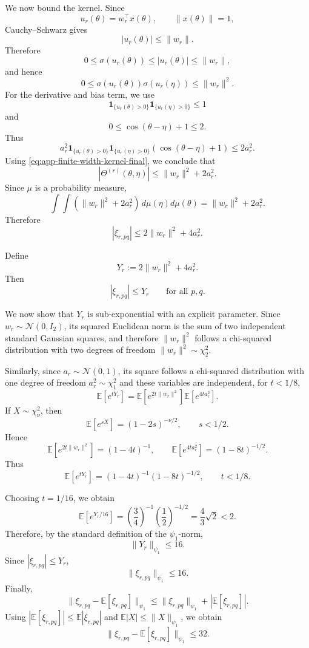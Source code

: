 We now bound the kernel. Since
\[
	u_r(\theta)=w_r^\top x(\theta),
	\qquad
	\|x(\theta)\|=1,
\]
Cauchy--Schwarz gives
\[
	|u_r(\theta)|\le \|w_r\|.
\]
Therefore
\[
	0\le \sigma(u_r(\theta))\le |u_r(\theta)|\le \|w_r\|,
\]
and hence
\[
	0\le \sigma(u_r(\theta))\sigma(u_r(\eta))\le \|w_r\|^2.
\]
For the derivative and bias term, we use
\[
	\mathbf 1_{\{u_r(\theta)>0\}}\mathbf 1_{\{u_r(\eta)>0\}}\le 1
\]
and
\[
	0\le \cos(\theta-\eta)+1\le 2.
\]
Thus
\[
	a_r^2
	\mathbf 1_{\{u_r(\theta)>0\}}
	\mathbf 1_{\{u_r(\eta)>0\}}
	(\cos(\theta-\eta)+1)
	\le
	2a_r^2.
\]
Using \eqref{eq:app-finite-width-kernel-final}, we conclude that
\[
	|\Theta^{(r)}(\theta,\eta)|
	\le
	\|w_r\|^2+2a_r^2.
\]
Since \(\mu\) is a probability measure,
\[
	\int\!\!\int
	(\|w_r\|^2+2a_r^2)\,d\mu(\eta)d\mu(\theta)
	=
	\|w_r\|^2+2a_r^2.
\]
Therefore
\begin{equation}
	|\xi_{r,pq}|
	\le
	2\|w_r\|^2+4a_r^2.
	\label{eq:app-finite-width-xi-bound}
\end{equation}

Define
\[
	Y_r:=2\|w_r\|^2+4a_r^2.
\]
Then
\[
	|\xi_{r,pq}|\le Y_r
	\qquad\text{for all }p,q.
\]

We now show that \(Y_r\) is sub-exponential with an explicit parameter. Since
\(w_r\sim \mathcal N(0,I_2)\), its squared Euclidean norm is the sum of two independent
standard Gaussian squares, and therefore \(\|w_r\|^2\) follows a chi-squared distribution
with two degrees of freedom \(\|w_r\|^2\sim \chi^2_2\).

Similarly, since \(a_r\sim \mathcal N(0,1)\), its square follows a chi-squared distribution
with one degree of freedom \(a_r^2\sim \chi^2_1\) and these variables are independent, for \(t<1/8\),
\[
	\mathbb E[e^{tY_r}]
	=
	\mathbb E[e^{2t\|w_r\|^2}]
	\mathbb E[e^{4ta_r^2}].
\]
If \(X\sim\chi^2_\nu\), then
\[
	\mathbb E[e^{sX}]=(1-2s)^{-\nu/2},
	\qquad s<1/2.
\]
Hence
\[
	\mathbb E[e^{2t\|w_r\|^2}]=(1-4t)^{-1},
	\qquad
	\mathbb E[e^{4ta_r^2}]=(1-8t)^{-1/2}.
\]
Thus
\begin{equation}
	\mathbb E[e^{tY_r}]
	=
	(1-4t)^{-1}(1-8t)^{-1/2},
	\qquad t<1/8.
	\label{eq:app-finite-width-Y-mgf}
\end{equation}

Choosing \(t=1/16\), we obtain
\[
	\mathbb E[e^{Y_r/16}]
	=
	\left(\frac34\right)^{-1}
	\left(\frac12\right)^{-1/2}
	=
	\frac43\sqrt2
	<2.
\]
Therefore, by the standard definition of the \(\psi_1\)-norm,
\begin{equation}
	\|Y_r\|_{\psi_1}\le 16.
	\label{eq:app-finite-width-Y-psi1}
\end{equation}
Since \(|\xi_{r,pq}|\le Y_r\),
\[
	\|\xi_{r,pq}\|_{\psi_1}\le 16.
\]
Finally,
\[
	\|\xi_{r,pq}-\mathbb E[\xi_{r,pq}]\|_{\psi_1}
	\le
	\|\xi_{r,pq}\|_{\psi_1}+|\mathbb E[\xi_{r,pq}]|.
\]
Using \(|\mathbb E[\xi_{r,pq}]|\le \mathbb E|\xi_{r,pq}|\) and
\(\mathbb E|X|\le \|X\|_{\psi_1}\), we obtain
\begin{equation}
	\|\xi_{r,pq}-\mathbb E[\xi_{r,pq}]\|_{\psi_1}\le 32.
	\label{eq:app-finite-width-centered-psi1}
\end{equation}

